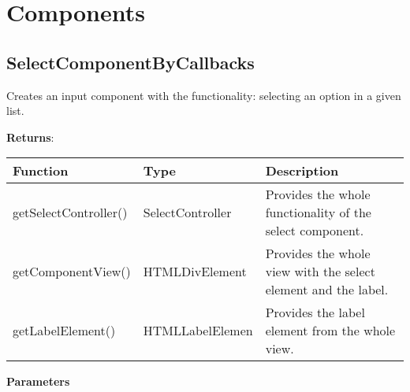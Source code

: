 \clearpage
\section*{Components}

\vspace*{6pt}
\subsection*{SelectComponentByCallbacks}

\vspace*{6pt}
Creates an input component with the functionality: selecting an option in a given list. 

\vspace*{18pt}
\noindent
\textbf{Returns}: 

\begin{table}[!htb] 
    \label{api:selectComponentByCallbacksReturn}
    \footnotesize
    \setlength\extrarowheight{4pt}
    \begin{tabular}{ p{3.5cm} p{3.5cm} p{5.5cm} }
        \toprule[1.2pt]
        \textbf{Function}     & \textbf{Type}        & \textbf{Description} \\
        \midrule
        getSelectController() & SelectController & Provides the whole functionality of the select component. \\
        getComponentView()    & HTMLDivElement   & Provides the whole view with the select element and the label. \\
        getLabelElement()     & HTMLLabelElemen  & Provides the label element from the whole view. \\
        \bottomrule[1.2pt]
    \end{tabular}
\end{table}

\vspace*{6pt}
\noindent
\textbf{Parameters}

